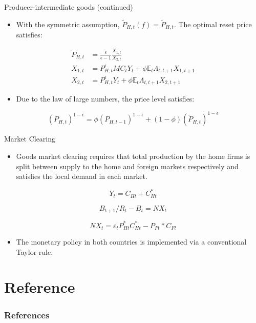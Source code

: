 \documentclass[10pt]{beamer}
\begin{document}
\begin{frame}{Producer-intermediate goods (continued)}

\begin{itemize}
    \item With the symmetric assumption, $\tilde{P}_{H, t}(f)=\tilde{P}_{H, t}$. The optimal reset price satisfies:
\end{itemize}


$$
\begin{aligned}
\tilde{P}_{H, t} & =\frac{\epsilon}{\epsilon-1} \frac{X_{1, t}}{X_{2, t}} \\
X_{1, t} & =P_{H, t}^{\epsilon} M C_{t} Y_{t}+\phi \mathbb{E}_{t} \Lambda_{t, t+1} X_{1, t+1} \\
X_{2, t} & =P_{H, t}^{\epsilon} Y_{t}+\phi \mathbb{E}_{t} \Lambda_{t, t+1} X_{2, t+1}
\end{aligned}
$$

\begin{itemize}
    \item Due to the law of large numbers, the price level satisfies:
\end{itemize}

$$
\left(P_{H, t}\right)^{1-\epsilon}=\phi\left(P_{H, t-1}\right)^{1-\epsilon}+(1-\phi)\left(\tilde{P}_{H, t}\right)^{1-\epsilon}
$$

\end{frame}

\begin{frame}{Market Clearing}

\begin{itemize}
    \item Goods market clearing requires that total production by the home firms is split between supply to the home and foreign markets respectively and satisfies the local demand in each market.
\end{itemize}


\begin{equation}
Y_t=C_{Ht}+C_{Ht}^*
\end{equation}

\begin{equation}
B_{t+1}/R_t-B_t=NX_t
\end{equation}

\begin{equation}
NX_t=\varepsilon_t P_{Ht}^*C_{Ht}^*-P_{Ft}*C_{Ft}
\end{equation}

\begin{itemize}
    \item The monetary policy in both countries is implemented via a conventional Taylor rule. 
\end{itemize}

\end{frame}




\section*{Reference}

\begin{frame}[allowframebreaks]
	\frametitle{References}
	
	\footnotesize
	
\end{frame}
\end{document}
